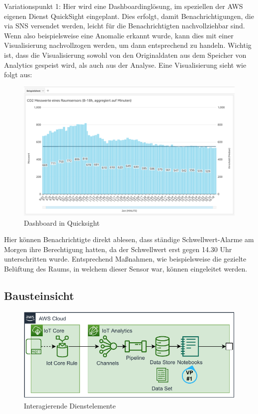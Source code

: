 Variationspunkt 1: Hier wird eine Dashboardinglösung, im speziellen der \ac{AWS} eigenen Dienst QuickSight eingeplant.  Dies erfolgt, damit Benachrichtigungen, die via \ac{SNS} versendet werden, leicht für die Benachrichtigten nachvollziehbar sind. Wenn also beispielsweise eine Anomalie erkannt wurde, kann dies mit einer Visualisierung nachvollzogen werden, um dann entsprechend zu handeln. Wichtig ist, dass die Visualisierung sowohl von den Originaldaten aus dem Speicher von \AWSIOT{} Analytics gespeist wird, als auch aus der Analyse. Eine Visualisierung sieht wie folgt aus:

\begin{figure}[H]
\centering
\includegraphics[width=\textwidth]{graphics/QuickSight-Beispiel.png}
\caption{Dashboard in Quicksight}
\label{abb:DashboardDBRA}
\end{figure}

Hier können Benachrichtigte direkt ablesen, dass ständige Schwellwert-Alarme am Morgen ihre Berechtigung hatten, da der Schwellwert erst gegen 14.30 Uhr unterschritten wurde. Entsprechend Maßnahmen, wie beispielsweise die gezielte Belüftung des Raums, in welchem dieser Sensor war, können eingeleitet werden.

\subsection{Bausteinsicht}
\begin{figure}[H]
\centering
\includegraphics[width=\textwidth]{graphics/DB-RA-Elements.pdf}
\caption{Interagierende Dienstelemente}
\label{abb:ElementeDBRA}
\end{figure}


